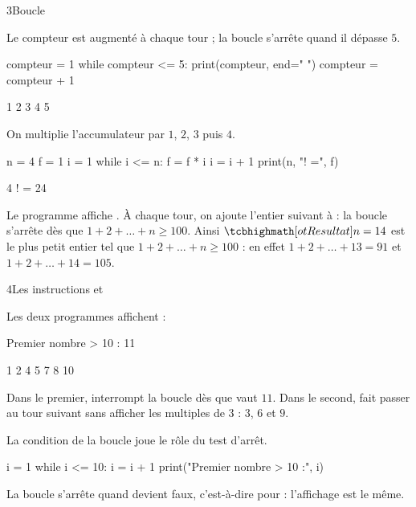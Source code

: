 \begin{corrige}{3}{Boucle }
\begin{questions}
  \item Le compteur est augmenté à chaque tour ; la boucle s'arrête quand il dépasse $5$.
\begin{codecote}[0.44]
\begin{pythoncol}
compteur = 1
while compteur <= 5:
    print(compteur, end=" ")
    compteur = compteur + 1
\end{pythoncol}
\cote
\begin{consolecol}
1 2 3 4 5
\end{consolecol}
\end{codecote}
  \item On multiplie l'accumulateur par $1$, $2$, $3$ puis $4$.
\begin{codecote}[0.44]
\begin{pythoncol}
n = 4
f = 1
i = 1
while i <= n:
    f = f * i
    i = i + 1
print(n, "! =", f)
\end{pythoncol}
\cote
\begin{consolecol}
4 ! = 24
\end{consolecol}
\end{codecote}
  \item Le programme affiche . À chaque tour, on ajoute l'entier suivant à  : la boucle s'arrête dès que
    $1+2+\dots+n\geq100$. Ainsi $\res{n=14}$ est le plus petit entier tel que $1+2+\dots+n\geq100$ : en effet $1+2+\dots+13=91$ et
    $1+2+\dots+14=105$.
\end{questions}
\end{corrige}

\begin{corrige}{4}{Les instructions  et }
\begin{questions}
  \item Les deux programmes affichent :
\begin{codecote}[0.58]
\begin{consolecol}
Premier nombre > 10 : 11
\end{consolecol}
\cote
\begin{consolecol}
1 2 4 5 7 8 10
\end{consolecol}
\end{codecote}
    Dans le premier,  interrompt la boucle dès que  vaut $11$. Dans le second,  fait passer au tour
    suivant sans afficher les multiples de $3$ : $3$, $6$ et $9$.
  \item La condition de la boucle  joue le rôle du test d'arrêt.
\begin{codecote}[0.52]
\begin{pythoncol}
i = 1
while i <= 10:
    i = i + 1
print("Premier nombre > 10 :", i)
\end{pythoncol}
\cote
La boucle s'arrête quand  devient faux, c'est-à-dire pour  : l'affichage est le même.
\end{codecote}
\end{questions}
\end{corrige}

